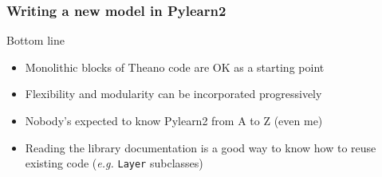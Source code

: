 \documentclass[mathserif, xcolor=dvipsnames]{beamer}
\begin{document}
\begin{frame}[fragile]
    \frametitle{Writing a new model in Pylearn2}

    \begin{block}{Bottom line}
    \begin{itemize}\addtolength{\itemsep}{0.5\baselineskip}
        \item{Monolithic blocks of Theano code are OK as a starting point}
        \item{Flexibility and modularity can be incorporated progressively}
        \item{Nobody's expected to know Pylearn2 from A to Z (even me)}
        \item{Reading the library documentation is a good way to know how to
              reuse existing code (\emph{e.g.} \texttt{Layer} subclasses)}
    \end{itemize}
    \end{block}
\end{frame}
\end{document}
